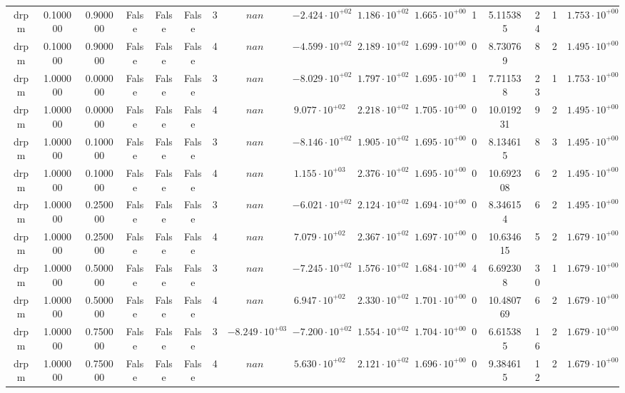 \begin{table}
\begin{tabular}{cccccccccccccccc}
drpm & 0.100000 & 0.900000 & False & False & False & 3 & $nan$ & $-2.424 \cdot 10^{+02}$ & $1.186 \cdot 10^{+02}$ & $1.665 \cdot 10^{+00}$ & 1 & 5.115385 & 24 & 1 & $1.753 \cdot 10^{+00}$ \\
drpm & 0.100000 & 0.900000 & False & False & False & 4 & $nan$ & $-4.599 \cdot 10^{+02}$ & $2.189 \cdot 10^{+02}$ & $1.699 \cdot 10^{+00}$ & 0 & 8.730769 & 8 & 2 & $1.495 \cdot 10^{+00}$ \\
drpm & 1.000000 & 0.000000 & False & False & False & 3 & $nan$ & $-8.029 \cdot 10^{+02}$ & $1.797 \cdot 10^{+02}$ & $1.695 \cdot 10^{+00}$ & 1 & 7.711538 & 23 & 1 & $1.753 \cdot 10^{+00}$ \\
drpm & 1.000000 & 0.000000 & False & False & False & 4 & $nan$ & $9.077 \cdot 10^{+02}$ & $2.218 \cdot 10^{+02}$ & $1.705 \cdot 10^{+00}$ & 0 & 10.019231 & 9 & 2 & $1.495 \cdot 10^{+00}$ \\
drpm & 1.000000 & 0.100000 & False & False & False & 3 & $nan$ & $-8.146 \cdot 10^{+02}$ & $1.905 \cdot 10^{+02}$ & $1.695 \cdot 10^{+00}$ & 0 & 8.134615 & 8 & 3 & $1.495 \cdot 10^{+00}$ \\
drpm & 1.000000 & 0.100000 & False & False & False & 4 & $nan$ & $1.155 \cdot 10^{+03}$ & $2.376 \cdot 10^{+02}$ & $1.695 \cdot 10^{+00}$ & 0 & 10.692308 & 6 & 2 & $1.495 \cdot 10^{+00}$ \\
drpm & 1.000000 & 0.250000 & False & False & False & 3 & $nan$ & $-6.021 \cdot 10^{+02}$ & $2.124 \cdot 10^{+02}$ & $1.694 \cdot 10^{+00}$ & 0 & 8.346154 & 6 & 2 & $1.495 \cdot 10^{+00}$ \\
drpm & 1.000000 & 0.250000 & False & False & False & 4 & $nan$ & $7.079 \cdot 10^{+02}$ & $2.367 \cdot 10^{+02}$ & $1.697 \cdot 10^{+00}$ & 0 & 10.634615 & 5 & 2 & $1.679 \cdot 10^{+00}$ \\
drpm & 1.000000 & 0.500000 & False & False & False & 3 & $nan$ & $-7.245 \cdot 10^{+02}$ & $1.576 \cdot 10^{+02}$ & $1.684 \cdot 10^{+00}$ & 4 & 6.692308 & 30 & 1 & $1.679 \cdot 10^{+00}$ \\
drpm & 1.000000 & 0.500000 & False & False & False & 4 & $nan$ & $6.947 \cdot 10^{+02}$ & $2.330 \cdot 10^{+02}$ & $1.701 \cdot 10^{+00}$ & 0 & 10.480769 & 6 & 2 & $1.679 \cdot 10^{+00}$ \\
drpm & 1.000000 & 0.750000 & False & False & False & 3 & $-8.249 \cdot 10^{+03}$ & $-7.200 \cdot 10^{+02}$ & $1.554 \cdot 10^{+02}$ & $1.704 \cdot 10^{+00}$ & 0 & 6.615385 & 16 & 2 & $1.679 \cdot 10^{+00}$ \\
drpm & 1.000000 & 0.750000 & False & False & False & 4 & $nan$ & $5.630 \cdot 10^{+02}$ & $2.121 \cdot 10^{+02}$ & $1.696 \cdot 10^{+00}$ & 0 & 9.384615 & 12 & 2 & $1.679 \cdot 10^{+00}$ \\

\end{tabular}
\end{table}
